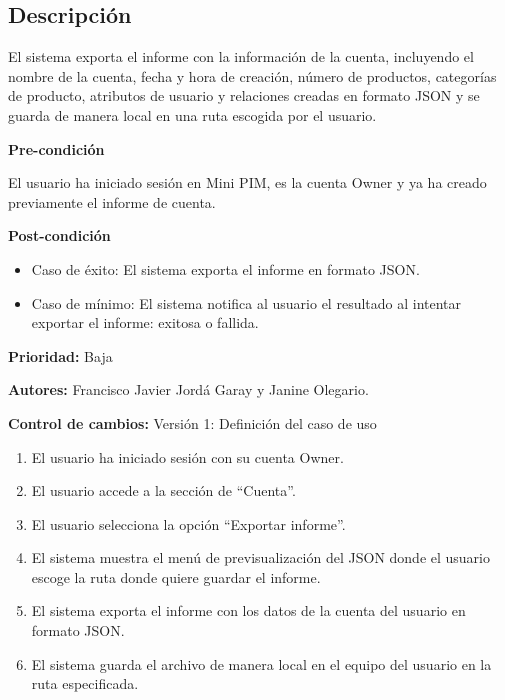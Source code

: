 
\subsection*{Descripción}
El sistema exporta el informe con la información de la cuenta, incluyendo el
nombre de la cuenta, fecha y hora de creación, número de productos, categorías 
de producto, atributos de usuario y relaciones creadas en formato JSON y se guarda 
de manera local en una ruta escogida por el usuario.

\vspace{0.15cm}

\textbf{Pre-condición}\par
El usuario ha iniciado sesión en Mini PIM, es la cuenta Owner y ya ha creado previamente el informe de cuenta.\par
\vspace{0.15cm}

\textbf{Post-condición}
\begin{itemize}
    \item Caso de éxito: El sistema exporta el informe en formato JSON.
    \item Caso de mínimo: El sistema notifica al usuario el resultado al intentar exportar el informe: exitosa o fallida.
\end{itemize}

\textbf{Prioridad:}
Baja
\vspace{0.15cm}

\textbf{Autores: }
Francisco Javier Jordá Garay y Janine Olegario.\par
\vspace{0.15cm}

\textbf{Control de cambios: } Versión 1: Definición del caso de uso

\begin{enumerate}
    \item El usuario ha iniciado sesión con su cuenta Owner.
    \item El usuario accede a la sección de \enquote{Cuenta}.
    \item El usuario selecciona la opción \enquote{Exportar informe}.
    \item El sistema muestra el menú de previsualización del JSON donde el usuario escoge la ruta donde quiere guardar el informe.
    \item El sistema exporta el informe con los datos de la cuenta del usuario en formato JSON.
    \item El sistema guarda el archivo de manera local en el equipo del usuario en la ruta especificada.
\end{enumerate}

